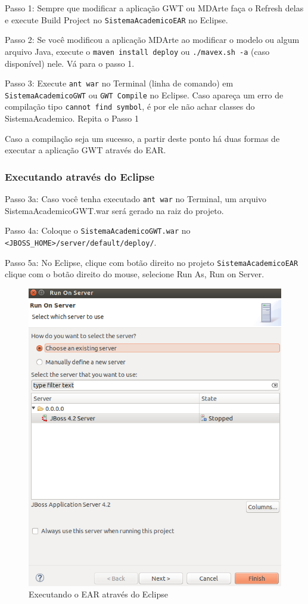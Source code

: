 Passo 1: Sempre que modificar a aplicação GWT ou MDArte faça o Refresh delas e execute Build Project no
\texttt{SistemaAcademicoEAR} no Eclipse.

Passo 2: Se você modificou a aplicação MDArte ao modificar o modelo ou algum arquivo Java, execute o \texttt{maven install deploy}
ou \texttt{./mavex.sh -a} (caso disponível) nele.
Vá para o passo 1.

Passo 3: Execute \texttt{ant war} no Terminal (linha de comando) em \texttt{SistemaAcademicoGWT} ou \texttt{GWT Compile} no
Eclipse.
Caso apareça um erro de compilação tipo \texttt{cannot find symbol}, é por ele não achar classes do SistemaAcademico.
Repita o Passo 1

Caso a compilação seja um sucesso, a partir deste ponto há duas formas de executar a aplicação GWT através do EAR.

\subsubsection{Executando através do Eclipse}

Passo 3a: Caso você tenha executado \texttt{ant war} no Terminal, um arquivo SistemaAcademicoGWT.war será gerado na raiz do
projeto.

Passo 4a: Coloque o \texttt{SistemaAcademicoGWT.war} no \texttt{<JBOSS\_HOME>/server/default/deploy/}.

Passo 5a: No Eclipse, clique com botão direito no projeto \texttt{SistemaAcademicoEAR} clique com o botão direito do mouse,
selecione Run As, Run on Server.

\begin{figure}[H]
	\centering
	\includegraphics[scale=0.4]{files/imgs/gwt-13.png}
	\caption{Executando o EAR através do Eclipse}
	\label{gwt13}
\end{figure}

